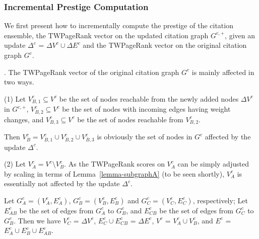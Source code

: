 {\subsubsection{Incremental Prestige Computation}

We first present how to incrementally compute the prestige of the citation ensemble, \ie the TWPageRank vector on the updated citation graph $G^{c,+}$,
given an update $\Delta^c$ = $\Delta V^c\cup\Delta E^c$ and the TWPageRank vector on the original citation graph $G^{c}$.



.
The TWPageRank vector of the original citation graph $G^{c}$ is mainly affected in two ways.



\sstab(1) Let $V^c_{B,1}\subseteq V^c$ be the set of nodes reachable from the newly added nodes $\Delta V^c$ in $G^{c,+}$, $V^c_{B,2}\subseteq V^c$ be the set of nodes with incoming edges having weight changes, and $V^c_{B,3}\subseteq V^c$ be the set of nodes reachable from  $V^c_{B,2}$.

Then $V^c_B=V^c_{B,1}\cup V^c_{B,2}\cup V^c_{B,3}$ is obviously the set of nodes in $G^{c}$ affected by the update $\Delta^c$.


\sstab(2) Let $V^c_A = V^c\setminus V^c_B$. As the TWPageRank scores on $V^c_A$ can be simply adjusted by scaling in terms of  Lemma~\ref{lemma-subgraphA} (to be seen shortly), $V^c_A$ is essentially not affected by the update $\Delta^c$.

Let $G^c_A=(V^c_A,E^c_A)$, $G^c_B=(V^c_B,E^c_B)$ and $G^c_C=(V^c_C,E^c_C)$, respectively;
Let $E^c_{AB}$ be the set of edges from $G^c_A$ to $G^c_B$, and $E^c_{CB}$ be the set of edges from $G^c_C$ to $G^c_B$.
%
Then we have $V^c_C$ = $\Delta V^c$, $E^c_C\cup E^c_{CB}$ = $\Delta E^c$, $V^c$ = $V^c_A\cup V^c_B$, and $E^c$ = $E^c_A\cup E^c_B\cup E^c_{AB}$.

}
